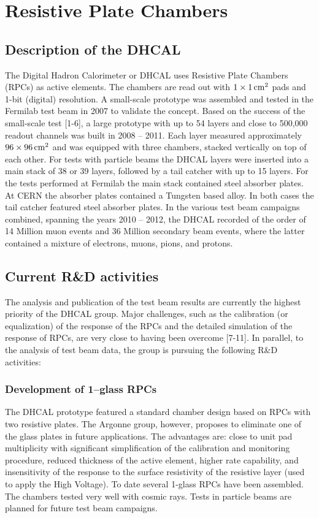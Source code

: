 \section{Resistive Plate Chambers}

\subsection{Description of the DHCAL}
The Digital Hadron Calorimeter or DHCAL uses Resistive Plate Chambers (RPCs) as active elements. The chambers are read out with $\unit[1 \times 1]{cm^2}$ pads and 1-bit (digital) resolution. A small-scale prototype was assembled and tested in the Fermilab test beam in 2007 to validate the concept.
Based on the success of the small-scale test [1-6], a large prototype with up to 54 layers and close to 500,000 readout channels was built in 2008 -- 2011. Each layer measured approximately $\unit[96 \times 96]{cm^2}$ and was equipped with three chambers, stacked vertically on top of each other.
For tests with particle beams the DHCAL layers were inserted into a main stack of 38 or 39 layers, followed by a tail catcher with up to 15 layers. For the tests performed at Fermilab the main stack contained steel absorber plates. At CERN the absorber plates contained a Tungsten based alloy. In both cases the tail catcher featured steel absorber plates.
In the various test beam campaigns combined, spanning the years 2010 -- 2012, the DHCAL recorded of the order of 14 Million muon events and 36 Million secondary beam events, where the latter contained a mixture of electrons, muons, pions, and protons.
\subsection{Current R\&D activities}
The analysis and publication of the test beam results are currently the highest priority of the DHCAL group. Major challenges, such as the calibration (or equalization) of the response of the RPCs and the detailed simulation of the response of RPCs, are very close to having been overcome [7-11].
In parallel, to the analysis of test beam data, the group is pursuing the following R\&D activities:
\subsubsection{Development of 1--glass RPCs}
The DHCAL prototype featured a standard chamber design based on RPCs with two resistive plates. The Argonne group, however, proposes to eliminate one of the glass plates in future applications. The advantages are: close to unit pad multiplicity with significant simplification of the calibration and monitoring procedure, reduced thickness of the active element, higher rate capability, and insensitivity of the response to the surface resistivity of the resistive layer (used to apply the High Voltage). To date several 1-glass RPCs have been assembled. The chambers tested very well with cosmic rays. Tests in particle beams are planned for future test beam campaigns.
